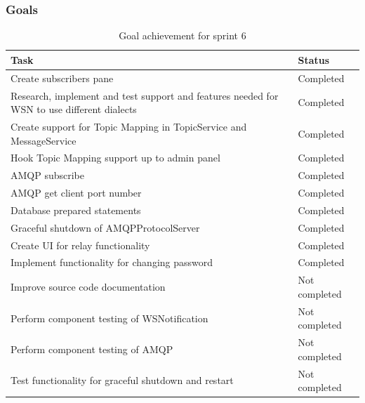 \subsubsection{Goals}
\label{subsec:project_lifecycle-development-sprint_6-goals}

\begin{table}[ht!]
\small
\centering
\begin{tabular}{ | p{10cm} | p{2cm} |}
\hline
\rowcolor{lightgray}
\textbf{Task} & \textbf{Status} \\
\hline
\rowcolor{green!30}
Create subscribers pane & Completed \\
\rowcolor{green!30}
Research, implement and test support and features needed for WSN to use different dialects & Completed \\
\rowcolor{green!30}
Create support for Topic Mapping in TopicService and MessageService & Completed \\
\rowcolor{green!30}
Hook Topic Mapping support up to admin panel & Completed \\\rowcolor{green!30}
AMQP subscribe & Completed \\
\rowcolor{green!30}
AMQP get client port number & Completed \\
\rowcolor{green!30}
Database prepared statements & Completed \\
\rowcolor{green!30}
Graceful shutdown of AMQPProtocolServer & Completed \\
\rowcolor{green!30}
Create UI for relay functionality & Completed \\
\rowcolor{green!30}
Implement functionality for changing password & Completed \\
\rowcolor{orange!40}
Improve source code documentation & Not completed \\
\rowcolor{orange!40}
Perform component testing of WSNotification & Not completed \\
\rowcolor{orange!40}
Perform component testing of AMQP & Not completed \\
\rowcolor{orange!40}
Test functionality for graceful shutdown and restart & Not completed \\
\hline
\end{tabular}
\caption{Goal achievement for sprint 6}
\label{tab:sprint 6, goals}
\end{table}

